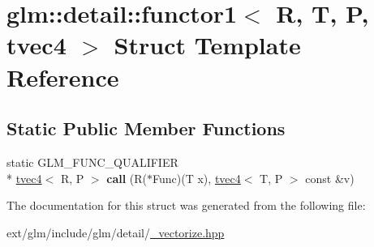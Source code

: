 \hypertarget{structglm_1_1detail_1_1functor1_3_01_r_00_01_t_00_01_p_00_01tvec4_01_4}{\section{glm\-:\-:detail\-:\-:functor1$<$ R, T, P, tvec4 $>$ Struct Template Reference}
\label{structglm_1_1detail_1_1functor1_3_01_r_00_01_t_00_01_p_00_01tvec4_01_4}
}
\subsection*{Static Public Member Functions}
\begin{DoxyCompactItemize}
\item 
\hypertarget{structglm_1_1detail_1_1functor1_3_01_r_00_01_t_00_01_p_00_01tvec4_01_4_a65634749e4ae6e35d4cc898481d4681f}{static G\-L\-M\-\_\-\-F\-U\-N\-C\-\_\-\-Q\-U\-A\-L\-I\-F\-I\-E\-R \\*
\hyperlink{structglm_1_1tvec4}{tvec4}$<$ R, P $>$ {\bfseries call} (R($\ast$Func)(T x), \hyperlink{structglm_1_1tvec4}{tvec4}$<$ T, P $>$ const \&v)}\label{structglm_1_1detail_1_1functor1_3_01_r_00_01_t_00_01_p_00_01tvec4_01_4_a65634749e4ae6e35d4cc898481d4681f}

\end{DoxyCompactItemize}


The documentation for this struct was generated from the following file\-:\begin{DoxyCompactItemize}
\item 
ext/glm/include/glm/detail/\hyperlink{__vectorize_8hpp}{\-\_\-vectorize.\-hpp}\end{DoxyCompactItemize}
